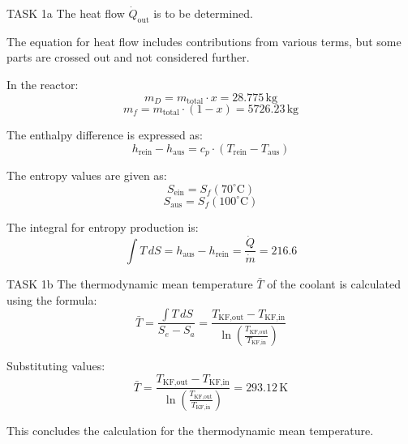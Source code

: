 TASK 1a  
The heat flow \( \dot{Q}_{\text{out}} \) is to be determined.  

The equation for heat flow includes contributions from various terms, but some parts are crossed out and not considered further.  

In the reactor:  
\[
m_D = m_{\text{total}} \cdot x = 28.775 \, \text{kg}
\]  
\[
m_f = m_{\text{total}} \cdot (1 - x) = 5726.23 \, \text{kg}
\]  

The enthalpy difference is expressed as:  
\[
h_{\text{rein}} - h_{\text{aus}} = c_{p} \cdot (T_{\text{rein}} - T_{\text{aus}})
\]  

The entropy values are given as:  
\[
S_{\text{ein}} = S_f(70^\circ\text{C})
\]  
\[
S_{\text{aus}} = S_f(100^\circ\text{C})
\]  

The integral for entropy production is:  
\[
\int T \, dS = h_{\text{aus}} - h_{\text{rein}} = \frac{\dot{Q}}{\dot{m}} = 216.6
\]  

TASK 1b  
The thermodynamic mean temperature \( \bar{T} \) of the coolant is calculated using the formula:  
\[
\bar{T} = \frac{\int T \, dS}{S_e - S_a} = \frac{T_{\text{KF,out}} - T_{\text{KF,in}}}{\ln \left( \frac{T_{\text{KF,out}}}{T_{\text{KF,in}}} \right)}
\]  

Substituting values:  
\[
\bar{T} = \frac{T_{\text{KF,out}} - T_{\text{KF,in}}}{\ln \left( \frac{T_{\text{KF,out}}}{T_{\text{KF,in}}} \right)} = 293.12 \, \text{K}
\]  

This concludes the calculation for the thermodynamic mean temperature.